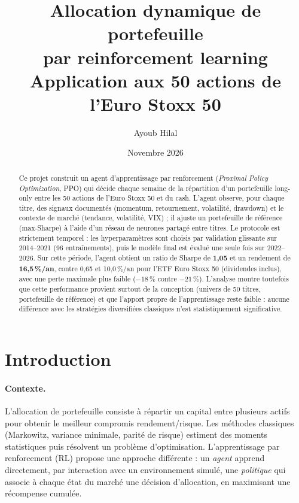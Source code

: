 \documentclass[11pt,a4paper]{article}
\title{\textbf{Allocation dynamique de portefeuille\\par reinforcement learning}\\[4pt]
\large Application aux 50 actions de l'Euro Stoxx 50}
\author{Ayoub Hilal}
\date{Novembre 2026}
\begin{document}
\maketitle

\begin{abstract}
\noindent Ce projet construit un agent d'apprentissage par renforcement (\emph{Proximal Policy Optimization}, PPO)
qui décide chaque semaine de la répartition d'un portefeuille long-only entre les 50 actions de l'Euro Stoxx 50
et du cash. L'agent observe, pour chaque titre, des signaux documentés (momentum, retournement, volatilité,
drawdown) et le contexte de marché (tendance, volatilité, VIX) ; il ajuste un portefeuille de référence
(max-Sharpe) à l'aide d'un réseau de neurones partagé entre titres. Le protocole est strictement temporel :
les hyperparamètres sont choisis par validation glissante sur 2014--2021 (96 entraînements), puis le modèle
final est évalué une seule fois sur 2022--2026. Sur cette période, l'agent obtient un ratio de Sharpe de
\textbf{1,05} et un rendement de \textbf{16,5\,\%/an}, contre 0,65 et 10,0\,\%/an pour l'ETF Euro Stoxx 50
(dividendes inclus), avec une perte maximale plus faible (\(-18\,\%\) contre \(-21\,\%\)). L'analyse montre
toutefois que cette performance provient surtout de la conception (univers de 50 titres, portefeuille de
référence) et que l'apport propre de l'apprentissage reste faible : aucune différence avec les stratégies
diversifiées classiques n'est statistiquement significative.
\end{abstract}

\tableofcontents
\newpage

\section{Introduction}

\paragraph{Contexte.} L'allocation de portefeuille consiste à répartir un capital entre plusieurs actifs pour
obtenir le meilleur compromis rendement/risque. Les méthodes classiques (Markowitz, variance minimale, parité
de risque) estiment des moments statistiques puis résolvent un problème d'optimisation. L'apprentissage par
renforcement (RL) propose une approche différente : un \emph{agent} apprend directement, par interaction avec
un environnement simulé, une \emph{politique} qui associe à chaque état du marché une décision d'allocation,
en maximisant une récompense cumulée.
\end{document}
